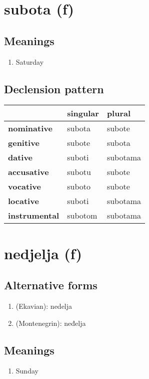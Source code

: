 \filbreak
\section{subota (f)}
\subsection*{Meanings}
\begin{enumerate}
\item Saturday
\end{enumerate}
\subsection*{Declension pattern}
\begin{tabularx}{\linewidth}{Xll}
\toprule
{} & singular &    plural \\
\midrule
\textbf{nominative  } &   subota &    subote \\
\textbf{genitive    } &   subote &    subota \\
\textbf{dative      } &   suboti &  subotama \\
\textbf{accusative  } &   subotu &    subote \\
\textbf{vocative    } &   suboto &    subote \\
\textbf{locative    } &   suboti &  subotama \\
\textbf{instrumental} &  subotom &  subotama \\
\bottomrule
\end{tabularx}

\filbreak
\section{nedjelja (f)}
\subsection*{Alternative forms}
\begin{enumerate}
\item (Ekavian): nedelja
\item (Montenegrin): neđelja
\end{enumerate}
\subsection*{Meanings}
\begin{enumerate}
\item Sunday
\end{enumerate}
